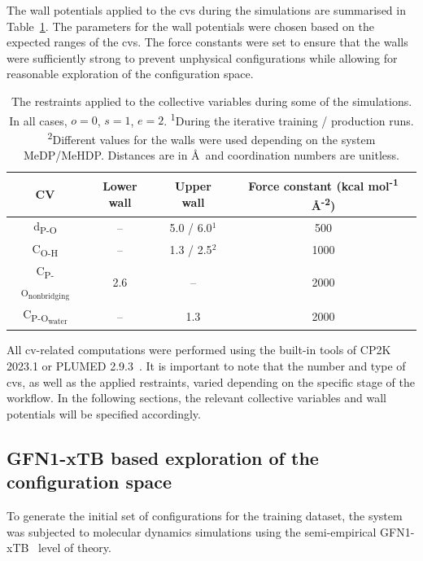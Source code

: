 The wall potentials applied to the \acp{cv} during the simulations are summarised in Table~\ref{tab:wall_potentials}. The parameters for the wall potentials were chosen based on the expected ranges of the \acp{cv}. The force constants were set to ensure that the walls were sufficiently strong to prevent unphysical configurations while allowing for reasonable exploration of the configuration space.

\begin{table}[b!]
    \centering
    \caption{The restraints applied to the collective variables during some of the simulations. In all cases, $o = 0$, $s = 1$, $e = 2$. \textsuperscript{1}During the iterative training / production runs. \textsuperscript{2}Different values for the walls were used depending on the system MeDP/MeHDP. Distances are in \AA\ and coordination numbers are unitless.}
    \label{tab:wall_potentials}
    \begin{tabular}{cccc}
    \toprule
    \textbf{CV} & \textbf{Lower wall} & \textbf{Upper wall} & \textbf{Force constant (kcal mol\textsuperscript{-1} \AA\textsuperscript{-2})} \\
    \midrule
    d\textsubscript{P-O} & -- & 5.0 / 6.0$^{1}$ & 500  \\
    C\textsubscript{O-H} & -- & 1.3 / 2.5$^{2}$ & 1000 \\
    C\textsubscript{P-O\textsubscript{nonbridging}} & 2.6 & -- & 2000 \\
    C\textsubscript{P-O\textsubscript{water}} & -- & 1.3 & 2000 \\
    \bottomrule
    \end{tabular}
\end{table}

All \ac{cv}-related computations were performed using the built-in tools of CP2K 2023.1 \citep{kuhneCP2KElectronicStructure2020} or PLUMED 2.9.3~\citep{tribelloPLUMED2New2014}. It is important to note that the number and type of \acp{cv}, as well as the applied restraints, varied depending on the specific stage of the workflow. In the following sections, the relevant collective variables and wall potentials will be specified accordingly.



\subsection{GFN1-xTB based exploration of the configuration space}
\label{subsec:xtb-exploration-of-configuration-space}
To generate the initial set of configurations for the training dataset, the system was subjected to molecular dynamics simulations using the semi-empirical GFN1-xTB~\citep{grimmeRobustAccurateTightBinding2017} level of theory. 

